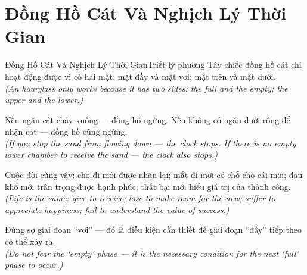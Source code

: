 \section{Đồng Hồ Cát Và Nghịch Lý Thời Gian}
\begin{truyen}{Đồng Hồ Cát Và Nghịch Lý Thời Gian}{Triết lý phương Tây}
 chiếc đồng hồ cát chỉ hoạt động được vì có hai mặt: mặt đầy và mặt vơi; mặt trên và mặt dưới.\\[4pt]
\textit{(An hourglass only works because it has two sides: the full and the empty; the upper and the lower.)}

Nếu ngăn cát chảy xuống --- đồng hồ ngừng. Nếu không có ngăn dưới rỗng để nhận cát --- đồng hồ cũng ngừng.\\[4pt]
\textit{(If you stop the sand from flowing down --- the clock stops. If there is no empty lower chamber to receive the sand --- the clock also stops.)}

Cuộc đời cũng vậy: cho đi mới được nhận lại; mất đi mới có chỗ cho cái mới; đau khổ mới trân trọng được hạnh phúc; thất bại mới hiểu giá trị của thành công.\\[4pt]
\textit{(Life is the same: give to receive; lose to make room for the new; suffer to appreciate happiness; fail to understand the value of success.)}

\end{truyen}
\begin{baihoc}
  Đừng sợ giai đoạn ``vơi'' --- đó là điều kiện cần thiết để giai đoạn ``đầy'' tiếp theo có thể xảy ra.\\[4pt]
  \textit{(Do not fear the `empty' phase --- it is the necessary condition for the next `full' phase to occur.)}
\end{baihoc}

